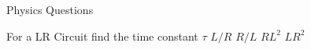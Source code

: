 \documentclass[10pt]{examdesign}
\begin{document}
	\begin{examtop}
		\noindent
		Physics Questions
	\end{examtop} 
	\begin{multiplechoice}[title={}, resetcounter=yes, examcolumns=2]
			
			\begin{question}
				For a LR Circuit find the time constant $ \tau $
				\choice [!] $ L/R $
				\choice $ R/L $
				\choice $ RL^2$
				\choice $ LR^2 $
			\end{question}
	\end{multiplechoice} 
	
\end{document}
